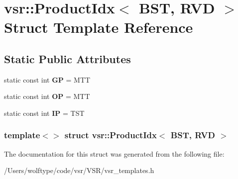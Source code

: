 \hypertarget{structvsr_1_1_product_idx_3_01_b_s_t_00_01_r_v_d_01_4}{\section{vsr\-:\-:Product\-Idx$<$ B\-S\-T, R\-V\-D $>$ Struct Template Reference}
\label{structvsr_1_1_product_idx_3_01_b_s_t_00_01_r_v_d_01_4}
}
\subsection*{Static Public Attributes}
\begin{DoxyCompactItemize}
\item 
\hypertarget{structvsr_1_1_product_idx_3_01_b_s_t_00_01_r_v_d_01_4_a68125bfcab4e44f7c975247893a5e5fc}{static const int {\bfseries G\-P} = M\-T\-T}\label{structvsr_1_1_product_idx_3_01_b_s_t_00_01_r_v_d_01_4_a68125bfcab4e44f7c975247893a5e5fc}

\item 
\hypertarget{structvsr_1_1_product_idx_3_01_b_s_t_00_01_r_v_d_01_4_adc65e04f5b600f0ca24323e53000ec4c}{static const int {\bfseries O\-P} = M\-T\-T}\label{structvsr_1_1_product_idx_3_01_b_s_t_00_01_r_v_d_01_4_adc65e04f5b600f0ca24323e53000ec4c}

\item 
\hypertarget{structvsr_1_1_product_idx_3_01_b_s_t_00_01_r_v_d_01_4_a5d6d5469dd97638c0951957500f9d8c2}{static const int {\bfseries I\-P} = T\-S\-T}\label{structvsr_1_1_product_idx_3_01_b_s_t_00_01_r_v_d_01_4_a5d6d5469dd97638c0951957500f9d8c2}

\end{DoxyCompactItemize}
\subsubsection*{template$<$$>$ struct vsr\-::\-Product\-Idx$<$ B\-S\-T, R\-V\-D $>$}



The documentation for this struct was generated from the following file\-:\begin{DoxyCompactItemize}
\item 
/\-Users/wolftype/code/vsr/\-V\-S\-R/vsr\-\_\-templates.\-h\end{DoxyCompactItemize}
